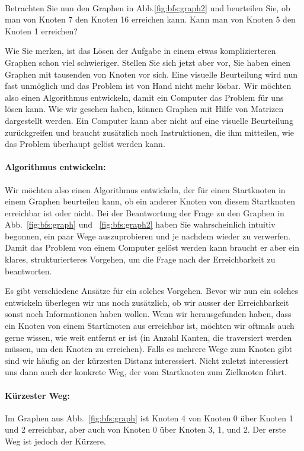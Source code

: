 \paragraph{}Betrachten Sie nun den Graphen in Abb.\ref{fig:bfs:graph2} und beurteilen Sie, ob man von Knoten 7 den Knoten 16 erreichen kann. Kann man von Knoten 5 den Knoten 1 erreichen?

Wie Sie merken, ist das L\"osen der Aufgabe in einem etwas komplizierteren Graphen schon viel schwieriger. Stellen Sie sich jetzt aber vor, Sie haben einen Graphen mit tausenden von Knoten vor sich. Eine visuelle Beurteilung wird nun fast unm\"oglich und das Problem ist von Hand nicht mehr l\"osbar. Wir m\"ochten also einen Algorithmus entwickeln, damit ein Computer das Problem f\"ur uns l\"osen kann. Wie wir gesehen haben, k\"onnen Graphen mit Hilfe von Matrizen dargestellt werden. Ein Computer kann aber nicht auf eine visuelle Beurteilung zur\"uckgreifen und braucht zus\"atzlich noch Instruktionen, die ihm mitteilen, wie das Problem \"uberhaupt gel\"ost werden kann.

\paragraph{Algorithmus entwickeln:}Wir m\"ochten also einen Algorithmus entwickeln, der f\"ur einen Startknoten in einem Graphen beurteilen kann, ob ein anderer Knoten von diesem Startknoten erreichbar ist oder nicht. Bei der Beantwortung der Frage zu den Graphen in Abb.~\ref{fig:bfs:graph} und ~\ref{fig:bfs:graph2} haben Sie wahrscheinlich intuitiv begonnen, ein paar Wege auszuprobieren und je nachdem wieder zu verwerfen. Damit das Problem von einem Computer gel\"ost werden kann braucht er aber ein klares, strukturierteres Vorgehen, um die Frage nach der Erreichbarkeit zu beantworten.

Es gibt verschiedene Ans\"atze f\"ur ein solches Vorgehen. Bevor wir nun ein solches entwickeln \"uberlegen wir uns noch zus\"atzlich, ob wir ausser der Erreichbarkeit sonst noch Informationen haben wollen. Wenn wir herausgefunden haben, dass ein Knoten von einem Startknoten aus erreichbar ist, m\"ochten wir oftmals auch gerne wissen, wie weit entfernt er ist (in Anzahl Kanten, die traversiert werden m\"ussen, um den Knoten zu erreichen). Falls es mehrere Wege zum Knoten gibt sind wir h\"aufig an der k\"urzesten Distanz interessiert. Nicht zuletzt interessiert uns dann auch der konkrete Weg, der vom Startknoten zum Zielknoten f\"uhrt.

\paragraph{K\"urzester Weg:}Im Graphen aus Abb.~\ref{fig:bfs:graph} ist Knoten 4 von Knoten 0 \"uber Knoten 1 und 2 erreichbar, aber auch von Knoten 0 \"uber Knoten 3, 1, und 2. Der erste Weg ist jedoch der K\"urzere.

